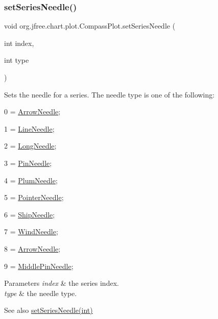 \subsubsection{\texorpdfstring{set\+Series\+Needle()}{setSeriesNeedle()}\hspace{0.1cm}{\footnotesize\ttfamily [2/3]}}
{\footnotesize\ttfamily void org.\+jfree.\+chart.\+plot.\+Compass\+Plot.\+set\+Series\+Needle (\begin{DoxyParamCaption}\item[{int}]{index,  }\item[{int}]{type }\end{DoxyParamCaption})}

Sets the needle for a series. The needle type is one of the following\+: 
\begin{DoxyItemize}
\item 0 = \mbox{\hyperlink{}{Arrow\+Needle}}; 
\item 1 = \mbox{\hyperlink{}{Line\+Needle}}; 
\item 2 = \mbox{\hyperlink{}{Long\+Needle}}; 
\item 3 = \mbox{\hyperlink{}{Pin\+Needle}}; 
\item 4 = \mbox{\hyperlink{}{Plum\+Needle}}; 
\item 5 = \mbox{\hyperlink{}{Pointer\+Needle}}; 
\item 6 = \mbox{\hyperlink{}{Ship\+Needle}}; 
\item 7 = \mbox{\hyperlink{}{Wind\+Needle}}; 
\item 8 = \mbox{\hyperlink{}{Arrow\+Needle}}; 
\item 9 = \mbox{\hyperlink{}{Middle\+Pin\+Needle}}; 
\end{DoxyItemize}
\begin{DoxyParams}{Parameters}
{\em index} & the series index. \\
\hline
{\em type} & the needle type.\\
\hline
\end{DoxyParams}
\begin{DoxySeeAlso}{See also}
\mbox{\hyperlink{classorg_1_1jfree_1_1chart_1_1plot_1_1_compass_plot_a6fae0892abeec874e3c75de69f6d1b13}{set\+Series\+Needle(int)}} 
\end{DoxySeeAlso}
\mbox{\label{classorg_1_1jfree_1_1chart_1_1plot_1_1_compass_plot_a93db9d9fa849e37a10977de35f196f35}} 
